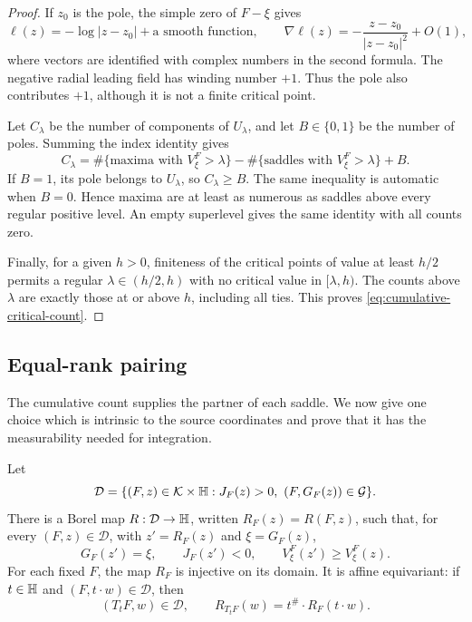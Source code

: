 \begin{proof}
If $z_0$ is the pole, the simple zero of $F-\xi$ gives
\[
 \ell(z)=-\log|z-z_0|+\text{a smooth function},\qquad
 \nabla\ell(z)=-\frac{z-z_0}{|z-z_0|^2}+O(1),
\]
where vectors are identified with complex numbers in the second formula.
The negative radial leading field has winding number $+1$.  Thus the pole
also contributes $+1$, although it is not a finite critical point.

Let $C_\lambda$ be the number of components of $U_\lambda$, and let
$B\in\{0,1\}$ be the number of poles.  Summing the index identity gives
\begin{equation}
 C_\lambda
 =\#\{\text{maxima with }V^F_\xi>\lambda\}
  -\#\{\text{saddles with }V^F_\xi>\lambda\}+B.
 \label{eq:level-index-count}
\end{equation}
If $B=1$, its pole belongs to $U_\lambda$, so $C_\lambda\ge B$.
The same inequality is automatic when $B=0$.  Hence maxima are at least
as numerous as saddles above every regular positive level.  An empty
superlevel gives the same identity with all counts zero.

Finally, for a given $h>0$, finiteness of the critical points of value at
least $h/2$ permits a regular $\lambda\in(h/2,h)$ with no critical value
in $[\lambda,h)$.  The counts above $\lambda$ are exactly those at or
above $h$, including all ties.  This proves
\eqref{eq:cumulative-critical-count}.
\end{proof}

\subsection{Equal-rank pairing}

The cumulative count supplies the partner of each saddle.  We now give
one choice which is intrinsic to the source coordinates and prove that
it has the measurability needed for integration.

\begin{proposition}
\label{prop:critical-pairing}
Let
\[
 \mathcal D=\{(F,z)\in\mathcal K\times\mathbb H:
                  J_F(z)>0,\ (F,G_F(z))\in\mathcal G\}.
\]
There is a Borel map $R:\mathcal D\to\mathbb H$, written $R_F(z)=R(F,z)$,
such that, for every $(F,z)\in\mathcal D$, with $z'=R_F(z)$ and
$\xi=G_F(z)$,
\begin{equation}
 G_F(z')=\xi,\qquad J_F(z')<0,\qquad
 V^F_\xi(z')\ge V^F_\xi(z).
 \label{eq:pairing-guarantees}
\end{equation}
For each fixed $F$, the map $R_F$ is injective on its domain.
It is affine equivariant: if $t\in\mathbb H$ and $(F,t\cdot w)\in\mathcal D$, then
\begin{equation}
 (T_tF,w)\in\mathcal D,\qquad
 R_{T_tF}(w)=t^{\#}\cdot R_F(t\cdot w).
 \label{eq:pairing-covariance}
\end{equation}
\end{proposition}

